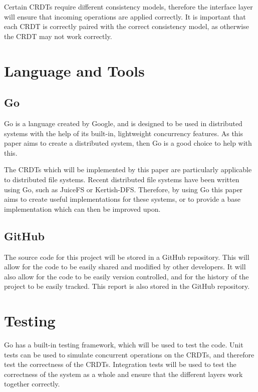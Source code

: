\documentclass[12pt]{report}
\begin{document}
Certain CRDTs require different consistency models, therefore the interface layer will ensure that incoming operations are applied correctly. It is important that each CRDT is correctly paired with the correct consistency model, as otherwise the CRDT may not work correctly. \par

\section{Language and Tools}
\subsection{Go}
Go is a language created by Google, and is designed to be used in distributed systems with the help of its built-in, lightweight concurrency features. As this paper aims to create a distributed system, then Go is a good choice to help with this. \par

The CRDTs which will be implemented by this paper are particularly applicable to distributed file systems. Recent distributed file systems have been written using Go, such as JuiceFS or Kertish-DFS. Therefore, by using Go this paper aims to create useful implementations for these systems, or to provide a base implementation which can then be improved upon. \par


\subsection{GitHub}
The source code for this project will be stored in a GitHub repository. This will allow for the code to be easily shared and modified by other developers. It will also allow for the code to be easily version controlled, and for the history of the project to be easily tracked. This report is also stored in the GitHub repository. \par

\section{Testing}
Go has a built-in testing framework, which will be used to test the code. Unit tests can be used to simulate concurrent operations on the CRDTs, and therefore test the correctness of the CRDTs. Integration tests will be used to test the correctness of the system as a whole and ensure that the different layers work together correctly. \par
\end{document}
